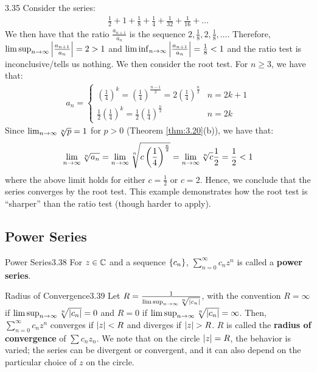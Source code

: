 \begin{example}{}{3.35}
    Consider the series:
    \begin{align*}
        \frac{1}{2} + 1 + \frac{1}{8} + \frac{1}{4} + \frac{1}{32} + \frac{1}{16} + \ldots
    \end{align*}
    We then have that the ratio $\frac{a_{n+1}}{a_n}$ is the sequence $2, \frac{1}{8}, 2, \frac{1}{8}, \ldots$. Therefore, $\limsup_{n \rightarrow \infty} \abs{\frac{a_{n+1}}{a_n}} = 2 > 1$ and $\liminf_{n \rightarrow \infty} \abs{\frac{a_{n+1}}{a_n}} = \frac{1}{8} < 1$ and the ratio test is inconclusive/tells us nothing. We then consider the root test. For $n \geq 3$, we have that:
    \begin{align*}
        a_n = \begin{cases}
            \left(\frac{1}{4}\right)^k = \left(\frac{1}{4}\right)^{\frac{n-1}{2}} = 2\left(\frac{1}{4}\right)^{\frac{n}{2}} & n = 2k + 1
            \\ \frac{1}{2}\left(\frac{1}{4}\right)^{k} = \frac{1}{2}\left(\frac{1}{4}\right)^{\frac{n}{2}} & n = 2k
        \end{cases}
    \end{align*}
    Since $\lim_{n \rightarrow \infty} \sqrt[n]{p} = 1$ for $p > 0$ (Theorem \ref{thm:3.20}(b)), we have that:
    \begin{align*}
        \lim_{n \rightarrow \infty} \sqrt[n]{a_n} = \lim_{n \rightarrow \infty} \sqrt[n]{c\left(\frac{1}{4}\right)^{\frac{n}{2}}} = \lim_{n \rightarrow \infty} \sqrt[n]{c} \frac{1}{2} = \frac{1}{2} < 1
    \end{align*}
    where the above limit holds for either $c = \frac{1}{2}$ or $c = 2$. Hence, we conclude that the series converges by the root test. This example demonstrates how the root test is ``sharper'' than the ratio test (though harder to apply).
\end{example}

\subsection{Power Series}

\setcounter{rudin}{37}
\begin{definition}{Power Series}{3.38}
    For $z \in \mathbb{C}$ and a sequence $\set{c_n}$, $\sum_{n=0}^\infty c_n z^n$ is called a \textbf{power series}.
\end{definition}

\begin{theorem}{Radius of Convergence}{3.39}
    Let $R = \frac{1}{\limsup_{n \rightarrow \infty}\sqrt[n]{\abs{c_n}}}$, with the convention $R = \infty$ if $\limsup_{n \rightarrow \infty}\sqrt[n]{\abs{c_n}} = 0$ and $R = 0$ if $\limsup_{n \rightarrow \infty}\sqrt[n]{\abs{c_n}} = \infty$. Then, $\sum_{n=0}^\infty c_n z^n$ converges if $\abs{z} < R$ and diverges if $\abs{z} > R$. $R$ is called the \textbf{radius of convergence} of $\sum c_n z_n$. We note that on the circle $\abs{z} = R$, the behavior is varied; the series can be divergent or convergent, and it can also depend on the particular choice of $z$ on the circle.
\end{theorem}

